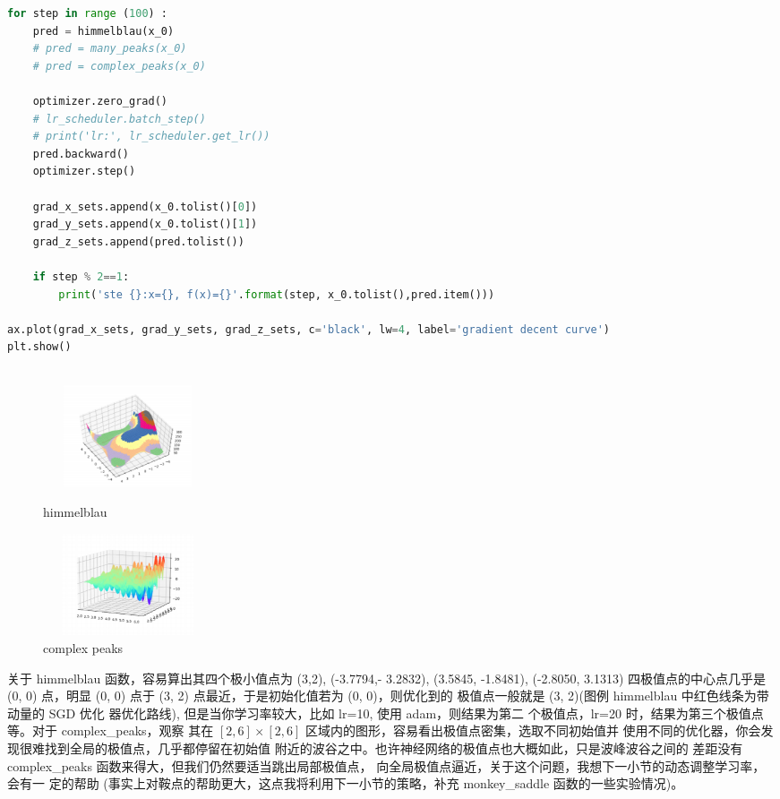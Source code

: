\documentclass[UTF8]{ctexart}
\begin{document}
\begin{lstlisting}[language=Python]
for step in range (100) :
	pred = himmelblau(x_0)
	# pred = many_peaks(x_0)
	# pred = complex_peaks(x_0)
	
	optimizer.zero_grad()
	# lr_scheduler.batch_step()
	# print('lr:', lr_scheduler.get_lr())
	pred.backward()
	optimizer.step()

	grad_x_sets.append(x_0.tolist()[0])
	grad_y_sets.append(x_0.tolist()[1])
	grad_z_sets.append(pred.tolist())

	if step % 2==1:
		print('ste {}:x={}, f(x)={}'.format(step, x_0.tolist(),pred.item()))

ax.plot(grad_x_sets, grad_y_sets, grad_z_sets, c='black', lw=4, label='gradient decent curve')
plt.show()
		
\end{lstlisting}

\begin{figure}[htbp]
	\centering
	\begin{minipage}[t]{0.48\textwidth}
	\centering
	\includegraphics[width=5cm, height=3cm]{./pic/himmelblau.png}
	\caption{himmelblau}
	\end{minipage}
	\begin{minipage}[t]{0.48\textwidth}
	\centering
	\includegraphics[width=5cm,height=3cm]{./pic/complex_peaks.png}
	\caption{complex peaks}
	\label{complex_peaks}
	\end{minipage}
\end{figure}


关于 himmelblau 函数，容易算出其四个极小值点为 (3,2), (-3.7794,-
3.2832), (3.5845, -1.8481), (-2.8050, 3.1313) 四极值点的中心点几乎是 (0, 0)
点，明显 (0, 0) 点于 (3, 2) 点最近，于是初始化值若为 (0, 0)，则优化到的
极值点一般就是 (3, 2)(图例 himmelblau 中红色线条为带动量的 SGD 优化
器优化路线), 但是当你学习率较大，比如 lr=10, 使用 adam，则结果为第二
个极值点，lr=20 时，结果为第三个极值点等。对于 complex\_peaks，观察
其在 $[2, 6] \times [2, 6]$ 区域内的图形，容易看出极值点密集，选取不同初始值并
使用不同的优化器，你会发现很难找到全局的极值点，几乎都停留在初始值
附近的波谷之中。也许神经网络的极值点也大概如此，只是波峰波谷之间的
差距没有 complex\_peaks 函数来得大，但我们仍然要适当跳出局部极值点，
向全局极值点逼近，关于这个问题，我想下一小节的动态调整学习率，会有一
定的帮助 (事实上对鞍点的帮助更大，这点我将利用下一小节的策略，补充
monkey\_saddle 函数的一些实验情况)。
\end{document}
